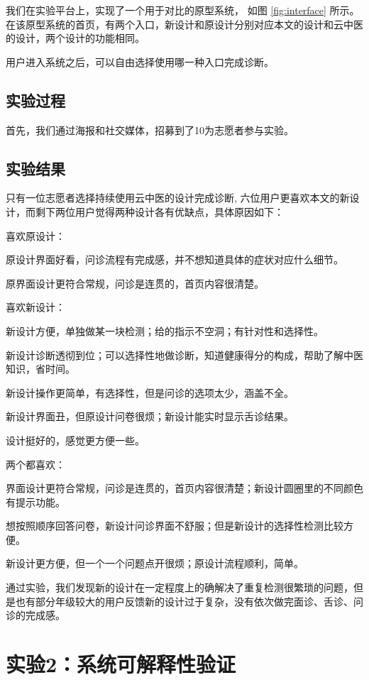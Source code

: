 我们在实验平台上，实现了一个用于对比的原型系统， 如图  \ref{fig:interface} 所示。在该原型系统的首页，有两个入口，新设计和原设计分别对应本文的设计和云中医的设计，两个设计的功能相同。

用户进入系统之后，可以自由选择使用哪一种入口完成诊断。

\subsection{实验过程}

首先，我们通过海报和社交媒体，招募到了10为志愿者参与实验。



\subsection{实验结果}

只有一位志愿者选择持续使用云中医的设计完成诊断, 六位用户更喜欢本文的新设计，而剩下两位用户觉得两种设计各有优缺点，具体原因如下：

喜欢原设计：

原设计界面好看，问诊流程有完成感，并不想知道具体的症状对应什么细节。

原界面设计更符合常规，问诊是连贯的，首页内容很清楚。


喜欢新设计：

新设计方便，单独做某一块检测；给的指示不空洞；有针对性和选择性。

新设计诊断透彻到位；可以选择性地做诊断，知道健康得分的构成，帮助了解中医知识，省时间。

新设计操作更简单，有选择性，但是问诊的选项太少，涵盖不全。

新设计界面丑，但原设计问卷很烦；新设计能实时显示舌诊结果。

设计挺好的，感觉更方便一些。


两个都喜欢：

界面设计更符合常规，问诊是连贯的，首页内容很清楚；新设计圆圈里的不同颜色有提示功能。

想按照顺序回答问卷，新设计问诊界面不舒服；但是新设计的选择性检测比较方便。

新设计更方便，但一个一个问题点开很烦；原设计流程顺利，简单。


通过实验，我们发现新的设计在一定程度上的确解决了重复检测很繁琐的问题，但是也有部分年级较大的用户反馈新的设计过于复杂，没有依次做完面诊、舌诊、问诊的完成感。

\section{实验2：系统可解释性验证}

